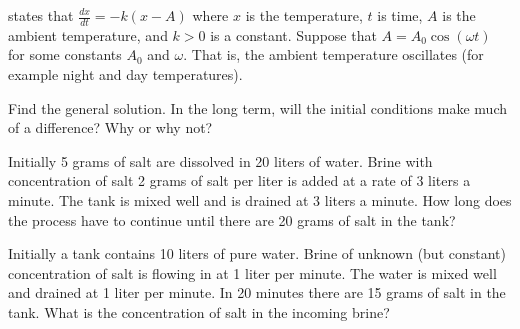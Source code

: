 \begin{exercise}
 states that $\frac{dx}{dt} = -k(x-A)$ where
$x$ is the temperature, $t$ is time, $A$ is the ambient temperature,
and $k > 0$ is a constant.
Suppose that $A = A_0 \cos (\omega t)$ for some constants $A_0$ and $\omega$.
That is, the ambient temperature oscillates (for example night and day
temperatures).
\begin{tasks}
\task Find the general solution.
\task In the long term, will the
initial conditions make much of a difference?  Why or why not?
\end{tasks}
\end{exercise}

\begin{exercise}
Initially 5 grams of salt are dissolved in 20 liters of water.  Brine
with concentration of salt 2 grams of salt per liter is added at a rate
of 3 liters a minute.  The tank is mixed well and is drained at 3 liters
a minute.  How long does the process have to continue until there are 20 grams
of salt in the tank?
\end{exercise}

\begin{exercise}
Initially a tank contains 10 liters of pure water.
Brine of unknown (but constant) concentration
of salt is flowing in at 1 liter per minute.
The water is mixed well and drained at 1 liter per minute.
In 20 minutes there are 15 grams of salt in the tank.  What is the
concentration of salt in the incoming brine?
\end{exercise}



